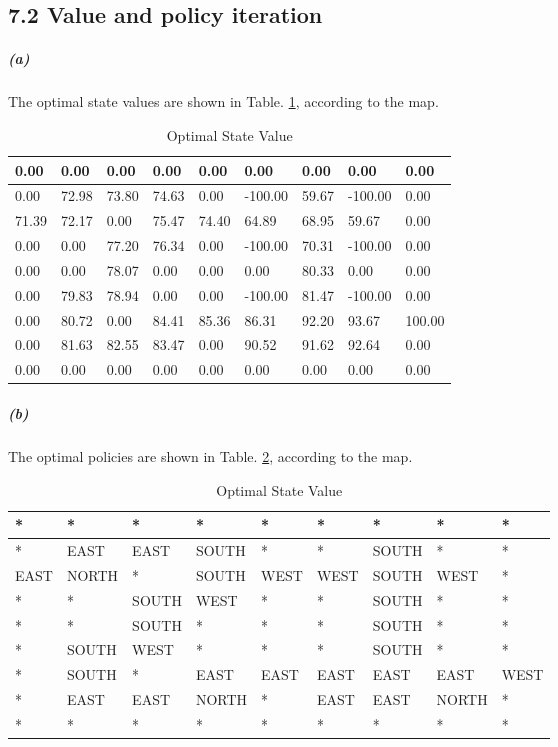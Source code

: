 \documentclass{article}
\begin{document}
\subsection*{7.2 Value and policy iteration}
\subparagraph*{(a)}
The optimal state values are shown in Table. \ref{statevalue}, according to the map.
\begin{table}
	\centering
	\begin{tabular}{|p{1.5cm}|p{1.5cm}|p{1.5cm}|p{1.5cm}|p{1.5cm}|p{1.5cm}|p{1.5cm}|p{1.5cm}|p{1.5cm}|}
		\hline
		0.00 &  0.00 &  0.00 &  0.00 &  0.00 &  0.00 &  0.00 &  0.00 &  0.00 \\ 
		\hline
		0.00 &  72.98 &  73.80 &  74.63 &  0.00 &  -100.00 &  59.67 &  -100.00 &  0.00 \\ 
		\hline
		71.39 &  72.17 &  0.00 &  75.47 &  74.40 &  64.89 &  68.95 &  59.67 &  0.00 \\ 
		\hline
		0.00 &  0.00 &  77.20 &  76.34 &  0.00 &  -100.00 &  70.31 &  -100.00 &  0.00 \\ 
		\hline
		0.00 &  0.00 &  78.07 &  0.00 &  0.00 &  0.00 &  80.33 &  0.00 &  0.00 \\ 
		\hline
		0.00 &  79.83 &  78.94 &  0.00 &  0.00 &  -100.00 &  81.47 &  -100.00 &  0.00 \\ 
		\hline
		0.00 &  80.72 &  0.00 &  84.41 &  85.36 &  86.31 &  92.20 &  93.67 &  100.00 \\ 
		\hline
		0.00 &  81.63 &  82.55 &  83.47 &  0.00 &  90.52 &  91.62 &  92.64 &  0.00 \\ 
		\hline
		0.00 &  0.00 &  0.00 &  0.00 &  0.00 &  0.00 &  0.00 &  0.00 &  0.00 \\ 
		\hline
	\end{tabular}
	\caption{Optimal State Value}
	\label{statevalue}
\end{table}


\subparagraph*{(b)}
The optimal policies are shown in Table. \ref{policy}, according to the map.
\begin{table}
	\centering
	\begin{tabular}{|p{1.5cm}|p{1.5cm}|p{1.5cm}|p{1.5cm}|p{1.5cm}|p{1.5cm}|p{1.5cm}|p{1.5cm}|p{1.5cm}|}
		\hline
		*  & *  & *  & *  & *  & *  & *  & *  & * \\
		\hline
		*  & EAST  & EAST  & SOUTH  & *  & *  & SOUTH  & *  & * \\
		\hline
		EAST  & NORTH  & *  & SOUTH  & WEST  & WEST  & SOUTH  & WEST  & * \\
		\hline
		*  & *  & SOUTH  & WEST  & *  & *  & SOUTH  & *  & * \\
		\hline
		*  & *  & SOUTH  & *  & *  & *  & SOUTH  & *  & * \\
		\hline
		*  & SOUTH  & WEST  & *  & *  & *  & SOUTH  & *  & * \\
		\hline
		*  & SOUTH  & *  & EAST  & EAST  & EAST  & EAST  & EAST  & WEST \\
		\hline
		*  & EAST  & EAST  & NORTH  & *  & EAST  & EAST  & NORTH  & * \\
		\hline
		*  & *  & *  & *  & *  & *  & *  & *  & * \\
		\hline
	\end{tabular}
	\caption{Optimal State Value}
	\label{policy}
\end{table}
\end{document}
